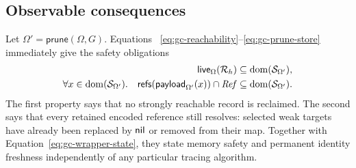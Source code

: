 \subsection{Observable consequences}

Let $\Omega'=\mathsf{prune}(\Omega,G)$.  Equations~
\eqref{eq:gc-reachability}--\eqref{eq:gc-prune-store} immediately give the
safety obligations
\begin{equation}\label{eq:gc-safety}
\begin{aligned}
 \mathsf{live}_{\Omega}(\mathcal R_h)
   &\subseteq\mathop{\mathrm{dom}}(\mathcal S_{\Omega'}),\\
 \forall x\in\mathop{\mathrm{dom}}(\mathcal S_{\Omega'}).\quad
 \mathsf{refs}(\mathsf{payload}_{\Omega'}(x))
   \cap\mathit{Ref}
   &\subseteq\mathop{\mathrm{dom}}(\mathcal S_{\Omega'}).
\end{aligned}
\end{equation}
The first property says that no strongly reachable record is reclaimed.  The
second says that every retained encoded reference still resolves: selected
weak targets have already been replaced by $\mathsf{nil}$ or removed from their map.
Together
with Equation~\eqref{eq:gc-wrapper-state}, they state memory safety and
permanent identity freshness independently of any particular tracing
algorithm.

